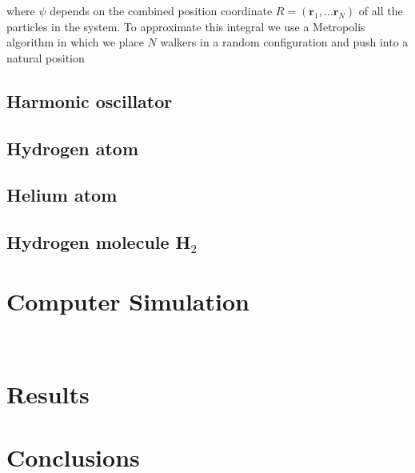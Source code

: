 \documentclass{article}
\begin{document}
where $\psi$ depends on the combined position coordinate $R=(\mathbf{r}_1,...\mathbf{r}_N)$ of all the particles in the system. To approximate this integral we use a Metropolis algorithm in which we place $N$ walkers in a random configuration and push into a natural position%
\subsection{Harmonic oscillator}
\subsection{Hydrogen atom}
\subsection{Helium atom}
\subsection{Hydrogen molecule H$_2$}


 

\section{Computer Simulation}
\


\section{Results}


\section{Conclusions}
\end{document}
